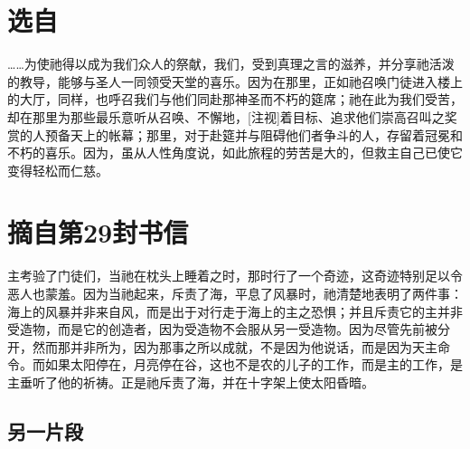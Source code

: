 \section{选自 }

\par

……为使祂得以成为我们众人的祭献，我们，受到真理之言的滋养，并分享祂活泼的教导，能够与圣人一同领受天堂的喜乐。因为在那里，正如祂召唤门徒进入楼上的大厅，同样，也呼召我们与他们同赴那神圣而不朽的筵席；祂在此为我们受苦，却在那里为那些最乐意听从召唤、不懈地，[注视]着目标、追求他们崇高召叫之奖赏的人预备天上的帐幕；那里，对于赴筵并与阻碍他们者争斗的人，存留着冠冕和不朽的喜乐。因为，虽从人性角度说，如此旅程的劳苦是大的，但救主自己已使它变得轻松而仁慈。\par



\section{摘自第29封书信}

\par

主考验了门徒们，当祂在枕头上睡着之时，那时行了一个奇迹，这奇迹特别足以令恶人也蒙羞。因为当祂起来，斥责了海，平息了风暴时，祂清楚地表明了两件事：海上的风暴并非来自风，而是出于对行走于海上的主之恐惧；并且斥责它的主并非受造物，而是它的创造者，因为受造物不会服从另一受造物。因为尽管先前被分开，然而那并非所为，因为那事之所以成就，不是因为他说话，而是因为天主命令。而如果太阳停在，月亮停在谷，这也不是农的儿子的工作，而是主的工作，是主垂听了他的祈祷。正是祂斥责了海，并在十字架上使太阳昏暗。\par


\subsection{另一片段}


